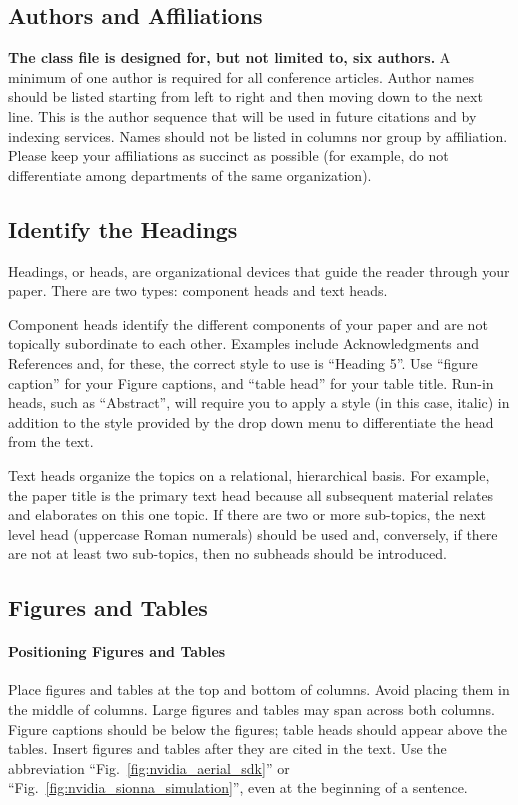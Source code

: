 \documentclass[conference]{IEEEtran}
\begin{document}
\subsection{Authors and Affiliations}
\textbf{The class file is designed for, but not limited to, six authors.} A 
minimum of one author is required for all conference articles. Author names 
should be listed starting from left to right and then moving down to the 
next line. This is the author sequence that will be used in future citations 
and by indexing services. Names should not be listed in columns nor group by 
affiliation. Please keep your affiliations as succinct as possible (for 
example, do not differentiate among departments of the same organization).

\subsection{Identify the Headings}
Headings, or heads, are organizational devices that guide the reader through 
your paper. There are two types: component heads and text heads.

Component heads identify the different components of your paper and are not 
topically subordinate to each other. Examples include Acknowledgments and 
References and, for these, the correct style to use is ``Heading 5''. Use 
``figure caption'' for your Figure captions, and ``table head'' for your 
table title. Run-in heads, such as ``Abstract'', will require you to apply a 
style (in this case, italic) in addition to the style provided by the drop 
down menu to differentiate the head from the text.

Text heads organize the topics on a relational, hierarchical basis. For 
example, the paper title is the primary text head because all subsequent 
material relates and elaborates on this one topic. If there are two or more 
sub-topics, the next level head (uppercase Roman numerals) should be used 
and, conversely, if there are not at least two sub-topics, then no subheads 
should be introduced.

\subsection{Figures and Tables}
\paragraph{Positioning Figures and Tables} Place figures and tables at the top and 
bottom of columns. Avoid placing them in the middle of columns. Large 
figures and tables may span across both columns. Figure captions should be 
below the figures; table heads should appear above the tables. Insert 
figures and tables after they are cited in the text. Use the abbreviation 
``Fig.~\ref{fig:nvidia_aerial_sdk}'' or ``Fig.~\ref{fig:nvidia_sionna_simulation}'', even at the beginning of a sentence.
\end{document}
